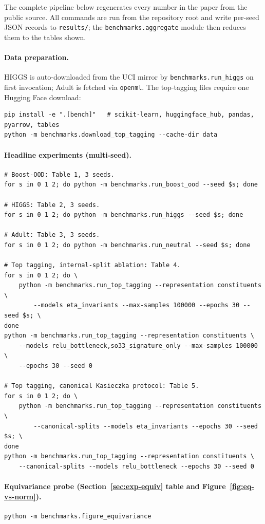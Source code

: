 \documentclass[11pt]{article}
\begin{document}
The complete pipeline below regenerates every number in the paper from
the public source. All commands are run from the repository root and
write per-seed JSON records to \texttt{results/}; the
\texttt{benchmarks.aggregate} module then reduces them to the tables
shown.

\paragraph{Data preparation.} HIGGS is auto-downloaded from the UCI
mirror by \texttt{benchmarks.run\_higgs} on first invocation; Adult is
fetched via \texttt{openml}. The top-tagging files require one
Hugging Face download:
\begin{verbatim}
pip install -e ".[bench]"   # scikit-learn, huggingface_hub, pandas, pyarrow, tables
python -m benchmarks.download_top_tagging --cache-dir data
\end{verbatim}

\paragraph{Headline experiments (multi-seed).}
\begin{verbatim}
# Boost-OOD: Table 1, 3 seeds.
for s in 0 1 2; do python -m benchmarks.run_boost_ood --seed $s; done

# HIGGS: Table 2, 3 seeds.
for s in 0 1 2; do python -m benchmarks.run_higgs --seed $s; done

# Adult: Table 3, 3 seeds.
for s in 0 1 2; do python -m benchmarks.run_neutral --seed $s; done

# Top tagging, internal-split ablation: Table 4.
for s in 0 1 2; do \
    python -m benchmarks.run_top_tagging --representation constituents \
        --models eta_invariants --max-samples 100000 --epochs 30 --seed $s; \
done
python -m benchmarks.run_top_tagging --representation constituents \
    --models relu_bottleneck,so33_signature_only --max-samples 100000 \
    --epochs 30 --seed 0

# Top tagging, canonical Kasieczka protocol: Table 5.
for s in 0 1 2; do \
    python -m benchmarks.run_top_tagging --representation constituents \
        --canonical-splits --models eta_invariants --epochs 30 --seed $s; \
done
python -m benchmarks.run_top_tagging --representation constituents \
    --canonical-splits --models relu_bottleneck --epochs 30 --seed 0
\end{verbatim}

\paragraph{Equivariance probe (Section~\ref{sec:exp-equiv} table and
Figure~\ref{fig:eq-vs-norm}).}
\begin{verbatim}
python -m benchmarks.figure_equivariance
\end{verbatim}
\end{document}
